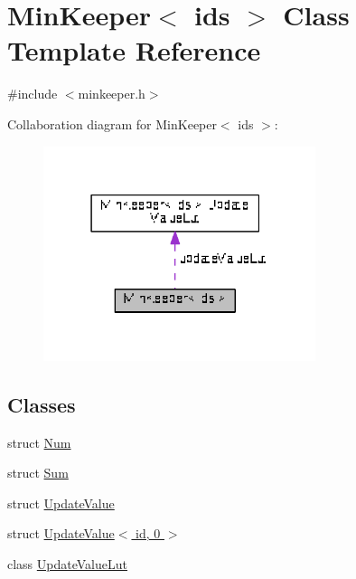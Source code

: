 \hypertarget{classMinKeeper}{}\section{Min\+Keeper$<$ ids $>$ Class Template Reference}
\label{classMinKeeper}


{\ttfamily \#include $<$minkeeper.\+h$>$}



Collaboration diagram for Min\+Keeper$<$ ids $>$\+:
\nopagebreak
\begin{figure}[H]
\begin{center}
\leavevmode
\includegraphics[width=226pt]{classMinKeeper__coll__graph}
\end{center}
\end{figure}
\subsection*{Classes}
\begin{DoxyCompactItemize}
\item 
struct \hyperlink{structMinKeeper_1_1Num}{Num}
\item 
struct \hyperlink{structMinKeeper_1_1Sum}{Sum}
\item 
struct \hyperlink{structMinKeeper_1_1UpdateValue}{Update\+Value}
\item 
struct \hyperlink{structMinKeeper_1_1UpdateValue_3_01id_00_010_01_4}{Update\+Value$<$ id, 0 $>$}
\item 
class \hyperlink{classMinKeeper_1_1UpdateValueLut}{Update\+Value\+Lut}
\end{DoxyCompactItemize}
